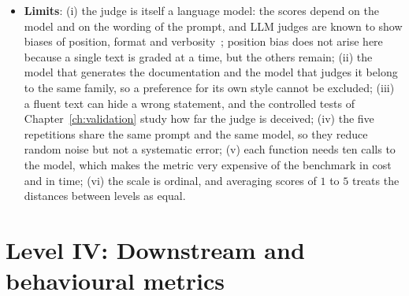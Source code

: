 \begin{itemize}[leftmargin=*, label=\textbullet]
	\item \textbf{Limits}: (i) the judge is itself a language model: the scores depend on the model and
	on the wording of the prompt, and LLM judges are known to show biases of position, format and
	verbosity~\cite{zhu_judgelm_2025}; position bias does not arise here because a single text is
	graded at a time, but the others remain; (ii) the model that generates the documentation and the
	model that judges it belong to the same family, so a preference for its own style cannot be
	excluded; (iii) a fluent text can hide a wrong statement, and the controlled tests of
	Chapter~\ref{ch:validation} study how far the judge is deceived; (iv) the five repetitions share
	the same prompt and the same model, so they reduce random noise but not a systematic error;
	(v) each function needs ten calls to the model, which makes the metric very expensive of the
	benchmark in cost and in time; (vi) the scale is ordinal, and averaging scores of $1$ to $5$
	treats the distances between levels as equal.
\end{itemize}

\section{Level IV: Downstream and behavioural metrics}
\label{sec:metrics-level4}

